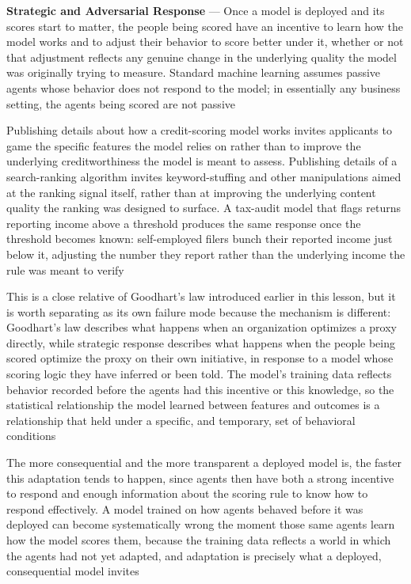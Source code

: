 \textbf{Strategic and Adversarial Response} --- Once a model is deployed and its
scores start to matter, the people being scored have an incentive to learn how the
model works and to adjust their behavior to score better under it, whether or
not that adjustment reflects any genuine change in the underlying quality the
model was originally trying to measure. Standard machine learning assumes passive
agents whose behavior does not respond to the model; in essentially any business
setting, the agents being scored are not passive

Publishing details about how a credit-scoring model works invites applicants to
game the specific features the model relies on rather than to improve the
underlying creditworthiness the model is meant to assess. Publishing details of a
search-ranking algorithm invites keyword-stuffing and other manipulations aimed at
the ranking signal itself, rather than at improving the underlying content
quality the ranking was designed to surface. A tax-audit model that flags returns
reporting income above a threshold produces the same response once the threshold
becomes known: self-employed filers bunch their reported income just below it,
adjusting the number they report rather than the underlying income the rule was
meant to verify

This is a close relative of Goodhart's law introduced earlier in this lesson,
but it is worth separating as its own failure mode because the mechanism is
different: Goodhart's law describes what happens when an organization optimizes a
proxy directly, while strategic response describes what happens when the people
being scored optimize the proxy on their own initiative, in response to a model whose
scoring logic they have inferred or been told. The model's training data
reflects behavior recorded before the agents had this incentive or this
knowledge, so the statistical relationship the model learned between features and
outcomes is a relationship that held under a specific, and temporary, set of behavioral
conditions

The more consequential and the more transparent a deployed model is, the faster this
adaptation tends to happen, since agents then have both a strong incentive to
respond and enough information about the scoring rule to know how to respond
effectively. A model trained on how agents behaved before it was deployed can become
systematically wrong the moment those same agents learn how the model scores them,
because the training data reflects a world in which the agents had not yet
adapted, and adaptation is precisely what a deployed, consequential model
invites

